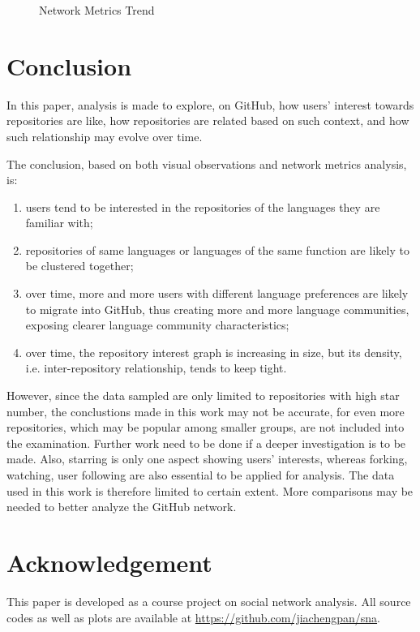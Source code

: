 \documentclass[11pt]{article}
\begin{document}
\begin{figure}[htp!]
{  } %
  \caption{Network Metrics Trend}
  \label{fig:trend}
\end{figure}

\section{Conclusion}

In this paper, analysis is made to explore, on GitHub, how users' interest towards repositories are like, how repositories are related based on such context, and how such relationship may evolve over time.

The conclusion, based on both visual observations and network metrics analysis, is:
\begin{enumerate}
\item users tend to be interested in the repositories of the languages they are familiar with;
\item repositories of same languages or languages of the same function are likely to be clustered together;
\item over time, more and more users with different language preferences are likely to migrate into GitHub, thus creating more and more language communities, exposing clearer language community characteristics;
\item over time, the repository interest graph is increasing in size, but its density, i.e. inter-repository relationship, tends to keep tight.
\end{enumerate}

However, since the data sampled are only limited to repositories with high star number, the conclustions made in this work may not be accurate, for even more repositories, which may be popular among smaller groups, are not included into the examination. Further work need to be done if a deeper investigation is to be made.
Also, starring is only one aspect showing users' interests, whereas forking, watching, user following are also essential to be applied for analysis. The data used in this work is therefore limited to certain extent. More comparisons may be needed to better analyze the GitHub network.

\section{Acknowledgement}

This paper is developed as a course project on social network analysis\cite{snacourse}.
All source codes as well as plots are available at \url{https://github.com/jiachengpan/sna}.

{\small


}
\end{document}
